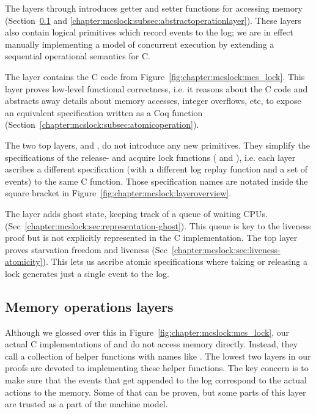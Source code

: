 The layers  through 
introduces getter and setter functions for accessing memory
(Section~\ref{chapter:mcslock:subsec:lowestmachinemodel} and
\ref{chapter:mcslock:subsec:abstractoperationlayer}). These layers also
contain logical primitives which record events to the log; we are in
effect manually implementing a model of concurrent execution by
extending a sequential operational semantics for C. 

The layer  contains the C code from 
Figure~\ref{fig:chapter:mcslock:mcs_lock}. This layer proves low-level
functional correctness, i.e. it reasons about the C code and
abstracts away details about memory accesses, integer overflows, etc,
to expose an equivalent specification written as a Coq
function (Section~\ref{chapter:mcslock:subsec:atomicoperation}).

The two top layers,  and , do not introduce any new primitives.
They simplify the specifications of 
the release- and acquire lock functions ( and
), i.e. each layer ascribes a different
specification (with a different log replay function and a set of events)
to the same C function. Those specification names are notated inside the square bracket in Figure~\ref{fig:chapter:mcslock:layeroverview}.

The layer  adds ghost state, keeping track of a
queue of waiting CPUs.
(Sec~\ref{chapter:mcslock:sec:representation-ghost}). This queue is key to the liveness proof but is not explicitly represented in the C implementation.
The top layer  proves starvation freedom and liveness
(Sec~\ref{chapter:mcslock:sec:liveness-atomicity}). This lets us ascribe atomic
specifications where taking or releasing a lock generates just a
single event to the log.




\subsection{Memory operations layers}
\label{chapter:mcslock:subsec:lowestmachinemodel}

Although we glossed over this in Figure~\ref{fig:chapter:mcslock:mcs_lock}, our
actual C implementations of  and
 do not access memory directly.  Instead, they call
a collection of helper functions with names like
. The lowest two layers in our proofs
are devoted to implementing these helper functions.
The key concern is to make sure that the events that get appended to the log
correspond to the actual actions to the memory. Some of that can be proven, 
but some parts of this layer are trusted as a part of the machine model.

